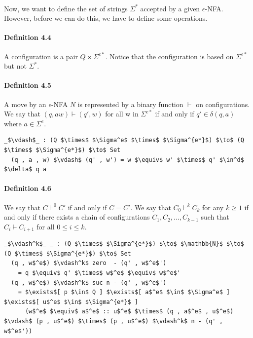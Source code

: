 \documentclass[twoside,openright,final]{bhamthesis}
\begin{document}
\paragraph{} Now, we want to define the set of strings \(\Sigma^*\) accepted by a given
\(\epsilon\)-NFA. However, before we can do this, we have to define
some operations.

\paragraph{Definition 4.4} A configuration is a pair \(Q \times
\Sigma^{e*}\). Notice that the configuration is based on
\(\Sigma^{e*}\) but not \(\Sigma^*\).

\paragraph{Definition 4.5} A move by an \(\epsilon\)-NFA \(N\) is
represented by a binary function \(\vdash\) on configurations. We say
that \((q, aw) \vdash (q' , w)\) for all w in \(\Sigma^{e*}\)
if and only if \(q' \in \delta (q , a)\) where \(a \in \Sigma^e\). 

\begin{lstlisting}[mathescape=true]
  _$\vdash$_ : (Q $\times$ $\Sigma^e$ $\times$ $\Sigma^{e*}$) $\to$ (Q $\times$ $\Sigma^{e*}$) $\to$ Set
  (q , a , w) $\vdash$ (q' , w') = w $\equiv$ w' $\times$ q' $\in^d$ $\delta$ q a
\end{lstlisting}

\paragraph{Definition 4.6} We say that \(C \vdash^0 C'\) if and only
if \(C = C'\). We say that \(C_0 \vdash^k C_k\) for any \(k \geq 1\) if and only if there exists a chain of
configurations \(C_1, C_2, ..., C_{k-1}\) such that \(C_i \vdash
C_{i+1}\) for all \(0 \leq i \leq k\). 

\begin{lstlisting}[mathescape=true]
  _$\vdash^k$_-_ : (Q $\times$ $\Sigma^{e*}$) $\to$ $\mathbb{N}$ $\to$ (Q $\times$ $\Sigma^{e*}$) $\to$ Set
  (q , w$^e$) $\vdash^k$ zero  - (q' , w$^e$')
    = q $\equiv$ q' $\times$ w$^e$ $\equiv$ w$^e$'
  (q , w$^e$) $\vdash^k$ suc n - (q' , w$^e$') 
    = $\exists$[ p $\in$ Q ] $\exists$[ a$^e$ $\in$ $\Sigma^e$ ] $\exists$[ u$^e$ $\in$ $\Sigma^{e*}$ ]
      (w$^e$ $\equiv$ a$^e$ :: u$^e$ $\times$ (q , a$^e$ , u$^e$) $\vdash$ (p , u$^e$) $\times$ (p , u$^e$) $\vdash^k$ n - (q' , w$^e$'))
\end{lstlisting}
\end{document}
